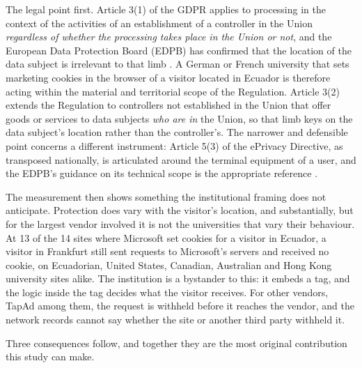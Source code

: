 \documentclass[]{interact}
\begin{document}
The legal point first. Article 3(1) of the GDPR applies to processing in the context of the activities of an establishment of a controller in the Union \emph{regardless of whether the processing takes place in the Union or not}, and the European Data Protection Board (EDPB) has confirmed that the location of the data subject is irrelevant to that limb \citep{gdpr2016,edpb2019territorial}. A German or French university that sets marketing cookies in the browser of a visitor located in Ecuador is therefore acting within the material and territorial scope of the Regulation. Article 3(2) extends the Regulation to controllers not established in the Union that offer goods or services to data subjects \emph{who are in} the Union, so that limb keys on the data subject's location rather than the controller's. The narrower and defensible point concerns a different instrument: Article 5(3) of the ePrivacy Directive, as transposed nationally, is articulated around the terminal equipment of a user, and the EDPB's guidance on its technical scope is the appropriate reference \citep{eprivacy2002,edpb2024eprivacy}.

The measurement then shows something the institutional framing does not anticipate. Protection does vary with the visitor's location, and substantially, but for the largest vendor involved it is not the universities that vary their behaviour. At 13 of the 14 sites where Microsoft set cookies for a visitor in Ecuador, a visitor in Frankfurt still sent requests to Microsoft's servers and received no cookie, on Ecuadorian, United States, Canadian, Australian and Hong Kong university sites alike. The institution is a bystander to this: it embeds a tag, and the logic inside the tag decides what the visitor receives. For other vendors, TapAd among them, the request is withheld before it reaches the vendor, and the network records cannot say whether the site or another third party withheld it.

Three consequences follow, and together they are the most original contribution this study can make.
\end{document}
